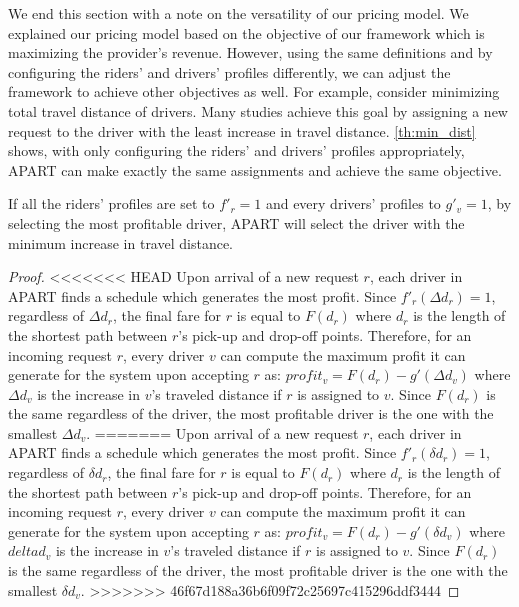 We end this section with a note on the versatility of our pricing model. We explained our pricing model based on the objective of our framework which is maximizing the provider's revenue. However, using the same definitions and by configuring the riders' and drivers' profiles differently, we can adjust the framework to achieve other objectives as well. For example, consider minimizing total travel distance of drivers. Many studies \cite{Ma13,Huang14,Ma15} achieve this goal by assigning a new request to the driver with the least increase in travel distance. \cref{th:min_dist} shows, with only configuring the riders' and drivers' profiles appropriately, APART can make exactly the same assignments and achieve the same objective.

\vspace{-2mm}
\begin{theorem}
\label{th:min_dist}
If all the riders' profiles are set to $f'_r = 1$ and every drivers' profiles to $g'_v = 1$, by selecting the most profitable driver, APART will select the driver with the minimum increase in travel distance.
\end{theorem}

\begin{proof}
<<<<<<< HEAD
Upon arrival of a new request $r$, each driver in APART finds a schedule which generates the most profit. Since $f'_r(\Delta d_r) = 1$, regardless of $\Delta d_r$, the final fare for $r$ is equal to $F(d_r)$ where $d_r$ is the length of the shortest path between $r$'s pick-up and drop-off points. Therefore, for an incoming request $r$, every driver $v$ can compute the maximum profit it can generate for the system upon accepting $r$ as: $profit_v = F(d_r) - g'(\Delta d_v)$ where $\Delta d_v$ is the increase in $v$'s traveled distance if $r$ is assigned to $v$. Since $F(d_r)$ is the same regardless of the driver, the most profitable driver is the one with the smallest $\Delta d_v$.
=======
Upon arrival of a new request $r$, each driver in APART finds a schedule which generates the most profit. Since $f'_r(\delta d_r) = 1$, regardless of $\delta d_r$, the final fare for $r$ is equal to $F(d_r)$ where $d_r$ is the length of the shortest path between $r$'s pick-up and drop-off points. Therefore, for an incoming request $r$, every driver $v$ can compute the maximum profit it can generate for the system upon accepting $r$ as: $profit_v = F(d_r) - g'(\delta d_v)$ where $delta d_v$ is the increase in $v$'s traveled distance if $r$ is assigned to $v$. Since $F(d_r)$ is the same regardless of the driver, the most profitable driver is the one with the smallest $\delta d_v$.
>>>>>>> 46f67d188a36b6f09f72c25697c415296ddf3444
\end{proof}